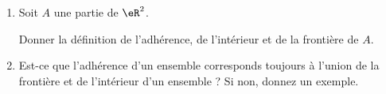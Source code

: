 \begin{exercice}\label{exoGeomAnal-0026}

  \begin{enumerate}
  \item Soit $A$ une partie de $\eR^2$. 

    Donner la définition de l'adhérence, de l'intérieur et de la frontière de $A$. 

  \item Est-ce que l'adhérence d'un ensemble corresponds toujours à l'union de la frontière et de l'intérieur d'un ensemble ? Si non, donnez un exemple.  
  \end{enumerate}


\end{exercice}
